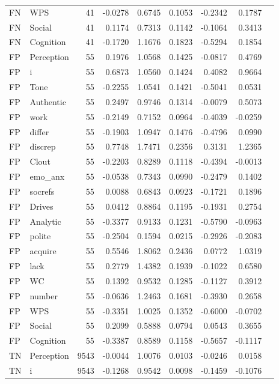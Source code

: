 \begin{longtable}{@{}llrrrrrrr@{}}
FN & WPS & 41 & -0.0278 & 0.6745 & 0.1053 & -0.2342 & 0.1787 \\
FN & Social & 41 & 0.1174 & 0.7313 & 0.1142 & -0.1064 & 0.3413 \\
FN & Cognition & 41 & -0.1720 & 1.1676 & 0.1823 & -0.5294 & 0.1854 \\
FP & Perception & 55 & 0.1976 & 1.0568 & 0.1425 & -0.0817 & 0.4769 \\
FP & i & 55 & 0.6873 & 1.0560 & 0.1424 & 0.4082 & 0.9664 \\
FP & Tone & 55 & -0.2255 & 1.0541 & 0.1421 & -0.5041 & 0.0531 \\
FP & Authentic & 55 & 0.2497 & 0.9746 & 0.1314 & -0.0079 & 0.5073 \\
FP & work & 55 & -0.2149 & 0.7152 & 0.0964 & -0.4039 & -0.0259 \\
FP & differ & 55 & -0.1903 & 1.0947 & 0.1476 & -0.4796 & 0.0990 \\
FP & discrep & 55 & 0.7748 & 1.7471 & 0.2356 & 0.3131 & 1.2365 \\
FP & Clout & 55 & -0.2203 & 0.8289 & 0.1118 & -0.4394 & -0.0013 \\
FP & emo\_anx & 55 & -0.0538 & 0.7343 & 0.0990 & -0.2479 & 0.1402 \\
FP & socrefs & 55 & 0.0088 & 0.6843 & 0.0923 & -0.1721 & 0.1896 \\
FP & Drives & 55 & 0.0412 & 0.8864 & 0.1195 & -0.1931 & 0.2754 \\
FP & Analytic & 55 & -0.3377 & 0.9133 & 0.1231 & -0.5790 & -0.0963 \\
FP & polite & 55 & -0.2504 & 0.1594 & 0.0215 & -0.2926 & -0.2083 \\
FP & acquire & 55 & 0.5546 & 1.8062 & 0.2436 & 0.0772 & 1.0319 \\
FP & lack & 55 & 0.2779 & 1.4382 & 0.1939 & -0.1022 & 0.6580 \\
FP & WC & 55 & 0.1392 & 0.9532 & 0.1285 & -0.1127 & 0.3912 \\
FP & number & 55 & -0.0636 & 1.2463 & 0.1681 & -0.3930 & 0.2658 \\
FP & WPS & 55 & -0.3351 & 1.0025 & 0.1352 & -0.6000 & -0.0702 \\
FP & Social & 55 & 0.2099 & 0.5888 & 0.0794 & 0.0543 & 0.3655 \\
FP & Cognition & 55 & -0.3387 & 0.8589 & 0.1158 & -0.5657 & -0.1117 \\
TN & Perception & 9543 & -0.0044 & 1.0076 & 0.0103 & -0.0246 & 0.0158 \\
TN & i & 9543 & -0.1268 & 0.9542 & 0.0098 & -0.1459 & -0.1076 \\

\end{longtable}
